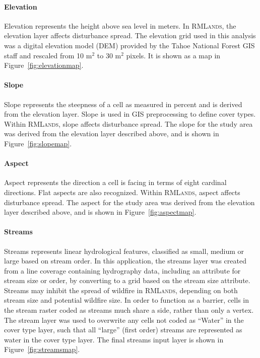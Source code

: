 \paragraph*{Elevation} 
Elevation represents the height above sea level in meters. In \textsc{RMLands}, the elevation layer affects disturbance spread. The elevation grid used in this analysis was a digital elevation model (DEM) provided by the Tahoe National Forest GIS staff and rescaled from 10 m$^2$ to 30 m$^2$ pixels. It is shown as a map in Figure~\ref{fig:elevationmap}.



\paragraph*{Slope} 
Slope represents the steepness of a cell as measured in percent and is derived from the elevation layer. Slope is used in GIS preprocessing to define cover types. Within \textsc{RMLands}, slope affects disturbance spread. The slope for the study area was derived from the elevation layer described above, and is shown in Figure~\ref{fig:slopemap}.


\paragraph*{Aspect} Aspect represents the direction a cell is facing in terms of eight cardinal directions. Flat aspects are also recognized. Within \textsc{RMLands}, aspect affects disturbance spread. The aspect for the study area was derived from the elevation layer described above, and is shown in Figure~\ref{fig:aspectmap}. 


\paragraph*{Streams} 
Streams represents linear hydrological features, classified as small, medium or large based on stream order. In this application, the streams layer was created from a line coverage containing hydrography data, including an attribute for stream size or order, by converting to a grid based on the stream size attribute. Streams may inhibit the spread of wildfire in \textsc{RMLands}, depending on both stream size and potential wildfire size. In order to function as a barrier, cells in the stream raster coded as streams much share a side, rather than only a vertex. The stream layer was used to overwrite any cells not coded as ``Water'' in the cover type layer, such that all ``large'' (first order) streams are represented as water in the cover type layer. The final streams input layer is shown in Figure~\ref{fig:streamsmap}.


